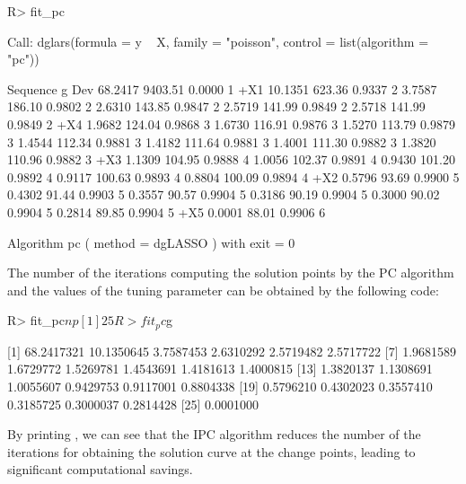 \begin{example}
R> fit_pc

Call:  dglars(formula = y ~ X, family = "poisson", control = list(algorithm = "pc"))

  Sequence        g      Dev    %
            68.2417  9403.51  0.0000   1
       +X1                              
            10.1351   623.36  0.9337   2
             3.7587   186.10  0.9802   2
             2.6310   143.85  0.9847   2
             2.5719   141.99  0.9849   2
             2.5718   141.99  0.9849   2
       +X4                              
             1.9682   124.04  0.9868   3
             1.6730   116.91  0.9876   3
             1.5270   113.79  0.9879   3
             1.4544   112.34  0.9881   3
             1.4182   111.64  0.9881   3
             1.4001   111.30  0.9882   3
             1.3820   110.96  0.9882   3
       +X3                              
             1.1309   104.95  0.9888   4
             1.0056   102.37  0.9891   4
             0.9430   101.20  0.9892   4
             0.9117   100.63  0.9893   4
             0.8804   100.09  0.9894   4
       +X2                              
             0.5796    93.69  0.9900   5
             0.4302    91.44  0.9903   5
             0.3557    90.57  0.9904   5
             0.3186    90.19  0.9904   5
             0.3000    90.02  0.9904   5
             0.2814    89.85  0.9904   5
       +X5                              
             0.0001    88.01  0.9906   6

Algorithm pc ( method = dgLASSO ) with exit = 0 
\end{example}

The number of the iterations computing the solution points by the PC algorithm and the values of the tuning parameter can be obtained by the following code:

\begin{example}
R> fit_pc$np

[1] 25

R> fit_pc$g

[1]  68.2417321 10.1350645  3.7587453  2.6310292  2.5719482  2.5717722
[7]   1.9681589  1.6729772  1.5269781  1.4543691  1.4181613  1.4000815
[13]  1.3820137  1.1308691  1.0055607  0.9429753  0.9117001  0.8804338
[19]  0.5796210  0.4302023  0.3557410  0.3185725  0.3000037  0.2814428
[25]  0.0001000
\end{example}

By printing , we can see that the IPC algorithm reduces the number of the iterations for obtaining the solution curve at the change points, leading to significant computational savings. 

